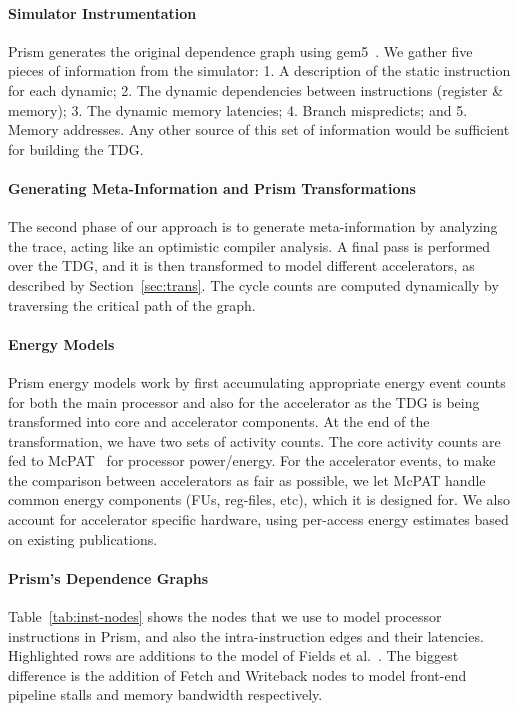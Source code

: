 \paragraph{Simulator Instrumentation}
Prism generates the original dependence graph using gem5~\cite{gem5}.
We gather five pieces of information from the simulator: 
1. A description of the static instruction for each dynamic;
2. The dynamic dependencies between instructions (register \& memory);
3. The dynamic memory latencies;
4. Branch mispredicts; and
5. Memory addresses.
Any other source of this set of information would be sufficient
for building the TDG.

\paragraph{Generating Meta-Information and Prism Transformations}
The second phase of our approach is to generate meta-information
by analyzing the trace, acting like an optimistic compiler analysis.
A final pass is performed over the TDG, and 
it is then transformed to model different accelerators, 
as described by Section~\ref{sec:trans}.  
The cycle counts are computed dynamically by traversing the
critical path of the graph.

\paragraph{Energy Models}
Prism energy models work by first accumulating appropriate energy event counts for both
the main processor and also for the accelerator as the TDG is being transformed into core
and accelerator components.  At the end of the
transformation, we have two sets of activity counts.  The core activity counts
are fed to McPAT~\cite{mcpat} for processor power/energy.  
For the accelerator events, to make
the comparison between accelerators as fair as possible, we let McPAT handle
common energy components (FUs, reg-files, etc), which it is designed
for.  We also account for accelerator specific hardware, using per-access
energy estimates based on existing publications.


\paragraph{Prism's Dependence Graphs}
 Table~\ref{tab:inst-nodes} shows the nodes that we use to model processor instructions
in Prism, and also the intra-instruction edges and their latencies.  
Highlighted rows are additions to the model of Fields et al.~\cite{fields:micro03}. 
 The biggest difference is the addition of
Fetch and Writeback nodes to model front-end pipeline stalls and memory bandwidth
respectively.

